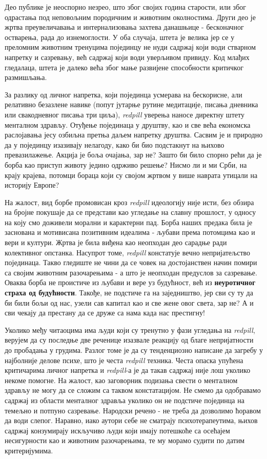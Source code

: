\documentclass[b5paper]{article}
\begin{document}
Део публике је неоспорно незрео, што због својих година старости, или због одрастања под неповољним породичним и животним околностима. Други део је жртва преувеличавања и интернализовања захтева данашњице - бесконачног остварења, рада до изнемоглости. У оба случаја, штета је велика јер се у преломним животним тренуцима појединцу не нуди садржај који води стварном напретку и сазревању, већ садржај који води уверљивом привиду. Код млађих гледалаца, штета је далеко већа због мање развијене способности критичког размишљања.

За разлику од личног напретка, који појединца усмерава на бескорисне, али релативно безазлене навике (попут јутарње рутине медитације, писања дневника или свакодневног писања три циља), \textit{redpill} уверења наносе директну штету менталном здрављу. Отуђење појединаца у друштву, као и све већа економска раслојавања јесу озбиљна претња даљем напретку друштва. Сасвим је и природно да у појединцу изазивају нелагоду, како би био подстакнут на њихово превазилажење. Акција је боља очајања, зар не? Зашто би било спорно рећи да је борба као приступ животу једино одрживо решење? Нисмо ли и ми Срби, на крају крајева, потомци бораца који су својом жртвом у више наврата утицали на историју Европе?

На жалост, вид борбе промовисан кроз \textit{redpill} идеологију није исти, без обзира на бројне покушаје да се представи као угледање на славну прошлост, у односу на коју смо доживели морални и карактерни пад. Борба наших предака била је заснована и мотивисана позитивним идеалима - љубави према потомцима као и вери и култури. Жртва је била виђена као неопходан део сарадње ради колективног опстанка. Насупрот томе, \textit{redpill} констатује вечно непријатељство појединаца. Такво гледиште не чини да се човек на достојанствен начин помири са својим животним разочарењима - а што је неопходан предуслов за сазревање. Оваква борба не проистиче из љубави и вере уз будућност, већ из \textbf{неуротичног страха од будућности}. Такође, не подстиче га на заједништво, јер сви су ту да би били бољи од нас, узели сав капитал као и све жене овог света, зар не? А и сви чекају да престану да се друже са нама када нас престигну!

Уколико међу читаоцима има људи који су тренутно у фази угледања на \textit{redpill}, верујем да су последње две реченице изазвале реакцију од благе непријатности до пробадања у грудима. Разлог томе је да су тенденциозно написане да загребу у најболније делове психе, што је честа \textit{redpill} техника. Честа опаска упућена критичарима личног напретка и \textit{redpill}-а је да такав садржај није лош уколико некоме помогне. На жалост, као заговорник подизања свести о менталном здрављу не могу да се сложим са таквом констатацијом. Не смемо да одобравамо садржај из области менталног здравља уколико он не подстиче појединца на темељно и потпуно сазревање. Народски речено - не треба да дозволимо ћоравом да води слепог. Наравно, иако аутори себе не сматрају психотерапеутима, њихов садржај конзумирају искључиво људи који имају потешкоће са осећајем несигурности као и животним разочарењима, те му морамо судити по датим критеријумима.
\end{document}
